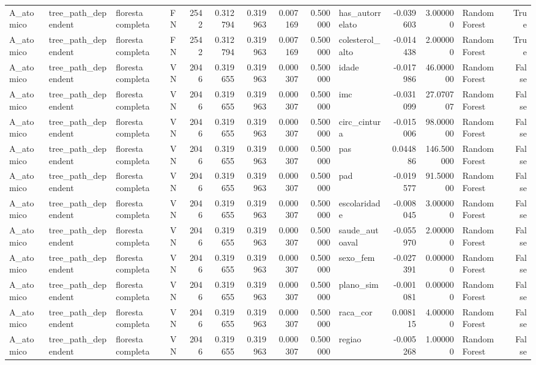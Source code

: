 \begin{tabular}{llllrrrrrlrrlr}
A_atomico & tree_path_dependent & floresta completa & FN & 2542 & 0.312794 & 0.319963 & 0.007169 & 0.500000 & has_autorrelato & -0.039603 & 3.000000 & Random Forest & True \\
A_atomico & tree_path_dependent & floresta completa & FN & 2542 & 0.312794 & 0.319963 & 0.007169 & 0.500000 & colesterol_alto & -0.014438 & 2.000000 & Random Forest & True \\
A_atomico & tree_path_dependent & floresta completa & VN & 2046 & 0.319655 & 0.319963 & 0.000307 & 0.500000 & idade & -0.017986 & 46.000000 & Random Forest & False \\
A_atomico & tree_path_dependent & floresta completa & VN & 2046 & 0.319655 & 0.319963 & 0.000307 & 0.500000 & imc & -0.031099 & 27.070707 & Random Forest & False \\
A_atomico & tree_path_dependent & floresta completa & VN & 2046 & 0.319655 & 0.319963 & 0.000307 & 0.500000 & circ_cintura & -0.015006 & 98.000000 & Random Forest & False \\
A_atomico & tree_path_dependent & floresta completa & VN & 2046 & 0.319655 & 0.319963 & 0.000307 & 0.500000 & pas & 0.044886 & 146.500000 & Random Forest & False \\
A_atomico & tree_path_dependent & floresta completa & VN & 2046 & 0.319655 & 0.319963 & 0.000307 & 0.500000 & pad & -0.019577 & 91.500000 & Random Forest & False \\
A_atomico & tree_path_dependent & floresta completa & VN & 2046 & 0.319655 & 0.319963 & 0.000307 & 0.500000 & escolaridade & -0.008045 & 3.000000 & Random Forest & False \\
A_atomico & tree_path_dependent & floresta completa & VN & 2046 & 0.319655 & 0.319963 & 0.000307 & 0.500000 & saude_autoaval & -0.055970 & 2.000000 & Random Forest & False \\
A_atomico & tree_path_dependent & floresta completa & VN & 2046 & 0.319655 & 0.319963 & 0.000307 & 0.500000 & sexo_fem & -0.027391 & 0.000000 & Random Forest & False \\
A_atomico & tree_path_dependent & floresta completa & VN & 2046 & 0.319655 & 0.319963 & 0.000307 & 0.500000 & plano_sim & -0.001081 & 0.000000 & Random Forest & False \\
A_atomico & tree_path_dependent & floresta completa & VN & 2046 & 0.319655 & 0.319963 & 0.000307 & 0.500000 & raca_cor & 0.008115 & 4.000000 & Random Forest & False \\
A_atomico & tree_path_dependent & floresta completa & VN & 2046 & 0.319655 & 0.319963 & 0.000307 & 0.500000 & regiao & -0.005268 & 1.000000 & Random Forest & False \\

\end{tabular}
